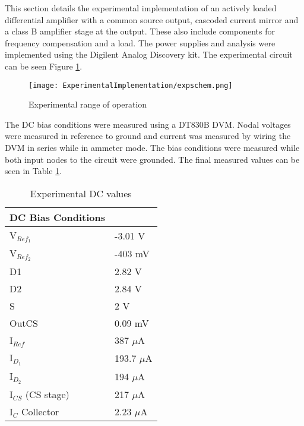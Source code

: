 
	
	
	
		
		
		
	This section details the experimental implementation of an actively loaded differential amplifier with a common source output, cascoded current mirror and a class B amplifier stage at the output. These also include components for frequency compensation and a load. The power supplies and analysis were implemented using the Digilent Analog Discovery kit. The experimental circuit can be seen Figure \ref{fig:expercircuit}.
		
		
				
		\begin{figure}[H]
			\begin{center}
				\texttt{[image: ExperimentalImplementation/expschem.png]}
				\caption{Experimental range of operation}
				\label{fig:expercircuit}
			\end{center}
		\end{figure}

	
	The DC bias conditions were measured using a DT830B DVM. Nodal voltages were measured in reference to ground and current was measured by wiring the DVM in series while in ammeter mode. The bias conditions were measured while both input nodes to the circuit were grounded. The final measured values can be seen in Table \ref{tab:expdc}.
		
		
		\begin{table}[H]
			\centering
			\caption{Experimental DC values}
			\label{tab:expdc}
			\begin{tabular}{|l|l|}
				\hline
				\textbf{DC Bias Conditions} &           \\ \hline
				V$_{Ref_1}$                        & -3.01 V   \\ \hline
				V$_{Ref_2}$                        & -403 mV \\ \hline
				D1                          & 2.82 V     \\ \hline
				D2                          & 2.84 V     \\ \hline
				S                           & 2 V    \\ \hline
				OutCS                       & 0.09 mV      \\ \hline
				I$_{Ref}$                        & 387 $\mu$A \\ \hline
				I$_{D_1}$                        &  193.7 $\mu$A\\ \hline
				I$_{D_2}$                        & 194 $\mu$A  \\ \hline
				I$_{CS}$  (CS stage)                      & 217 $\mu$A \\ \hline
				I$_{C}$   Collector                     & 2.23 $\mu$A \\ \hline
				
			\end{tabular}
		\end{table}
		
